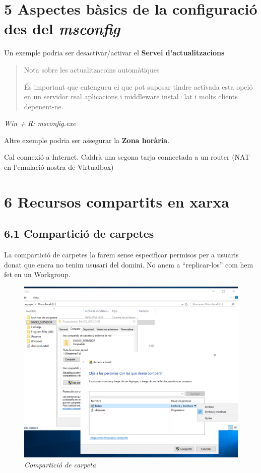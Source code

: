 \documentclass[
  a4paper,
]{article}
\begin{document}
\section{\texorpdfstring{5 Aspectes bàsics de la configuració des del
\emph{msconfig}}{5 Aspectes bàsics de la configuració des del msconfig}}\label{aspectes-buxe0sics-de-la-configuraciuxf3-des-del-msconfig}

Un exemple podria ser desactivar/activar el \textbf{Servei
d'actualitzacions}

\begin{quote}
Nota sobre les actualitzacoins automàtiques

És important que entengueu el que pot suposar tindre activada esta opció
en un servidor real aplicacions i middleware instal·lat i molts clients
depenent-ne.
\end{quote}

\emph{Win + R: msconfig.exe}

Altre exemple podria ser assegurar la \textbf{Zona horària}.

Cal connexió a Internet. Caldrà una segona tarja connectada a un router
(NAT en l'emulació nostra de Virtualbox)

\section{6 Recursos compartits en
xarxa}\label{recursos-compartits-en-xarxa}

\subsection{6.1 Compartició de
carpetes}\label{comparticiuxf3-de-carpetes}

La compartició de carpetes la farem sense especificar permisos per a
usuaris donat que encra no tenim ususari del domini. No anem a
``replicar-los'' com hem fet en un Workgroup.

\begin{figure}
\centering
\includegraphics{png/ADDS/Compartir.png}
\caption{\emph{Compartició de carpeta}}
\end{figure}
\end{document}
